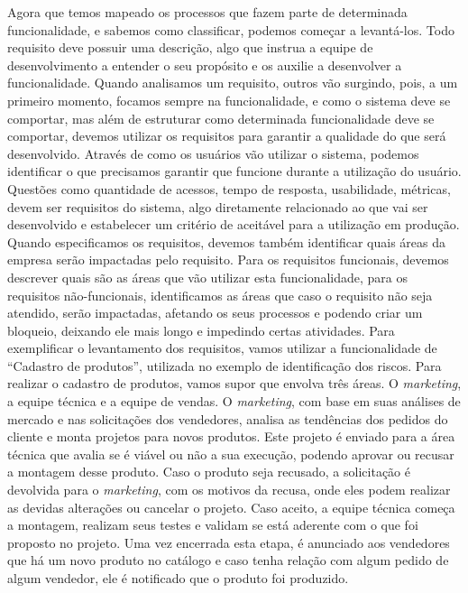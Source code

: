       Agora que temos mapeado os processos que fazem parte de determinada funcionalidade,
      e sabemos como classificar, podemos começar a levantá-los. Todo requisito
      deve possuir uma descrição, algo que instrua a equipe de desenvolvimento a entender
      o seu propósito e os auxilie a desenvolver a funcionalidade. Quando analisamos
      um requisito, outros vão surgindo, pois, a um primeiro momento, focamos sempre
      na funcionalidade, e como o sistema deve se comportar, mas além de estruturar
      como determinada funcionalidade deve se comportar, devemos utilizar os requisitos
      para garantir a qualidade do que será desenvolvido. Através de como os
      usuários vão utilizar o sistema, podemos identificar o que precisamos
      garantir que funcione durante a utilização do usuário. Questões como quantidade
      de acessos, tempo de resposta, usabilidade, métricas, devem ser requisitos
      do sistema, algo diretamente relacionado ao que vai ser desenvolvido e
      estabelecer um critério de aceitável para a utilização em produção.
      Quando especificamos os requisitos, devemos também identificar quais áreas
      da empresa serão impactadas pelo requisito. Para os requisitos funcionais,
      devemos descrever quais são as áreas que vão utilizar esta funcionalidade,
      para os requisitos não-funcionais, identificamos as áreas que caso o requisito
      não seja atendido, serão impactadas, afetando os seus processos e podendo criar
      um bloqueio, deixando ele mais longo e impedindo certas atividades. Para
      exemplificar o levantamento dos requisitos, vamos utilizar a funcionalidade
      de “Cadastro de produtos”, utilizada no exemplo de identificação dos riscos. \newline
      Para realizar o cadastro de produtos, vamos supor que envolva três áreas. O
      \textit{marketing}, a equipe técnica e a equipe de vendas. O \textit{marketing},
      com base em suas análises de mercado e nas solicitações dos vendedores, analisa
      as tendências dos pedidos do cliente e monta projetos para novos produtos.
      Este projeto é enviado para a área técnica que avalia se é viável ou não a
      sua execução, podendo aprovar ou recusar a montagem desse produto. Caso o
      produto seja recusado, a solicitação é devolvida para o \textit{marketing},
      com os motivos da recusa, onde eles podem realizar as devidas alterações ou
      cancelar o projeto. Caso aceito, a equipe técnica começa a montagem,
      realizam seus testes e validam se está aderente com o que foi proposto no
      projeto. Uma vez encerrada esta etapa, é anunciado aos vendedores que há um
      novo produto no catálogo e caso tenha relação com algum pedido de algum vendedor,
      ele é notificado que o produto foi produzido. \newline


